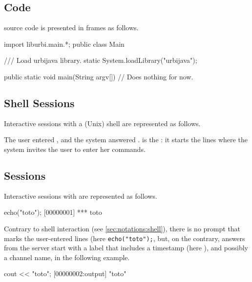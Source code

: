 \subsection{\Java Code}
\label{sec:notations:java}

\Java source code is presented in frames as follows.

\begin{java}
import liburbi.main.*;
public class Main
{
    /// Load urbijava library.
    static
    {
        System.loadLibrary("urbijava");
    }

    public static void main(String argv[])
    {
      // Does nothing for now.
    }
}
\end{java}

\subsection{Shell Sessions}
\label{sec:notations:shell}

Interactive sessions with a (Unix) shell are represented as follows.


The user entered , and the system answered
.  \samp{\$} is the : it starts the lines where
the system invites the user to enter her commands.

\subsection{\us Sessions}
\label{sec:notations:us}

Interactive sessions with \urbi are represented as follows.

\begin{urbiscript}[firstnumber=1]
echo("toto");
[00000001] *** toto
\end{urbiscript}

Contrary to shell interaction (see \autoref{sec:notations:shell}),
there is no prompt that marks the user-entered lines (here
\lstinline|echo("toto");|, but, on the contrary, answers from the \urbi
server start with a label that includes a timestamp (here
), and possibly a channel name,  in the
following example.

\begin{urbiscript}
cout << "toto";
[00000002:output] "toto"
\end{urbiscript}


